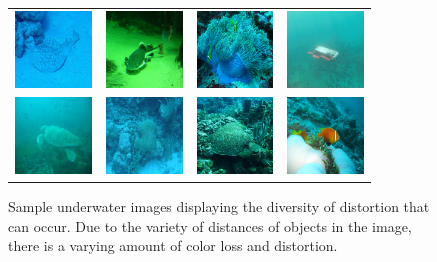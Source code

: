 \documentclass[letterpaper, 10pt, conference]{ieeeconf}
\begin{document}
\begin{figure}
\centering
\begin{tabular}{p{1.7cm} p{1.7cm} p{1.7cm} p{1.7cm}}
   
   \includegraphics[width=0.8in]{n01496331_7428_f1} &
   \includegraphics[width=0.8in]{n01496331_16340_f1} &
   \includegraphics[width=0.8in]{n01914609_5148_f1} &
   \includegraphics[width=0.8in]{robot_f1} \\
   \includegraphics[width=0.8in]{n01664065_30279_f1} &
   \includegraphics[width=0.8in]{n01917289_5711_f1} &
   \includegraphics[width=0.8in]{n01917289_4087_f1} &
   \includegraphics[width=0.8in]{n02607072_10395_f1} \\

\end{tabular}
\label{fig:samples}
\caption{Sample underwater images displaying the diversity of distortion that can occur. Due to the variety of distances
of objects in the image, there is a varying amount of color loss and distortion.}
\end{figure}
\end{document}
